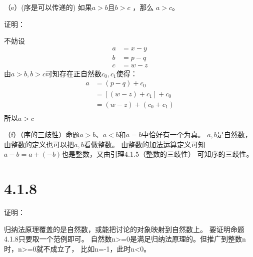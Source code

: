 \documentclass{article}
\theoremstyle{mystyle}
\theoremstyle{zproofstyle}
\begin{document}
（e）(序是可以传递的) 如果$a > b$且$b > c$ ，那么 $a > c$。

证明：

不妨设
\begin{align}
  a & = x - y \\
  b & = p - q \\
  c & = w - z 
\end{align}
由$a>b,b>c$可知存在正自然数$c_0,c_1$使得：
\begin{align*}
  a & = (p - q) + c_0         \\
    & = [(w - z) + c_1] + c_0 \\
    & = (w - z) + (c_0 + c_1) \\
\end{align*}
所以$a > c$

（f）（序的三歧性）命题$a>b$、$a<b$和$a=b$中恰好有一个为真。
$a,b$是自然数，由整数的定义也可以把$a,b$看做整数。
由整数的加法运算定义可知$a-b=a+(-b)$也是整数，又由引理4.1.5（整数的三歧性）
可知序的三歧性。

\section*{4.1.8}

证明：

归纳法原理覆盖的是自然数，或能把讨论的对象映射到自然数上。
要证明命题4.1.8只要取一个范例即可。
自然数n>=0是满足归纳法原理的。但推广到整数n时，n>=0就不成立了，
比如n=-1，此时n<0。
\end{document}
